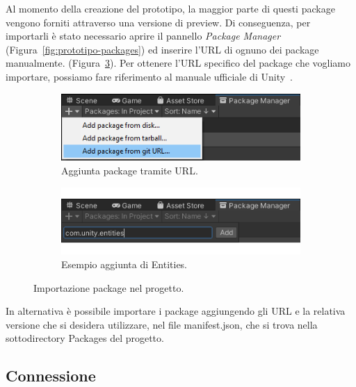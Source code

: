 Al momento della creazione del prototipo, la maggior parte di questi package vengono forniti attraverso una versione di preview. Di conseguenza, per importarli è stato necessario aprire il pannello \emph{Package Manager} (Figura~\ref{fig:prototipo-packages}) ed inserire l'URL di ognuno dei package manualmente. (Figura~\ref{fig:prototipo-import-packages}). Per ottenere l'URL specifico del package che vogliamo importare, possiamo fare riferimento al manuale ufficiale di Unity~\cite{doc:unity-preview-packages}.


\begin{figure}[!ht]
    \begin{subfigure}{.49\textwidth}
      \centering
      \includegraphics[width=.95\linewidth]{gfx/imgs/chapter4/SetupAddPackageFromURL.png}
      \caption{Aggiunta package tramite URL.}
      \label{fig:prototipo-import1}
    \end{subfigure}
    \begin{subfigure}{.49\textwidth}
      \centering
      \includegraphics[width=.95\linewidth]{gfx/imgs/chapter4/SetupAddPackageFromURL(2).png}
      \caption{Esempio aggiunta di Entities.}
      \label{fig:prototipo-import2}
    \end{subfigure}
    \caption{Importazione package nel progetto.}
    \label{fig:prototipo-import-packages}
\end{figure}

In alternativa è possibile importare i package aggiungendo gli URL e la relativa versione che si desidera utilizzare, nel file manifest.json, che si trova nella sottodirectory Packages del progetto.

\subsection{Connessione}


